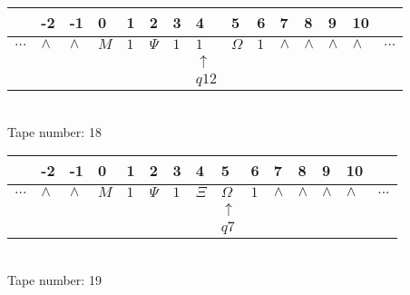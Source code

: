 \documentclass{article}
\begin{document}
\begin{table}[H]
\centering
\begin{tabular}{lllllllllllllll}
 & -2 & -1 & 0 & 1 & 2 & 3 & 4 & 5 & 6 & 7 & 8 & 9 & 10 & \\
\hline
$...$ & \multicolumn{1}{|l|}{$\wedge$} & \multicolumn{1}{|l|}{$\wedge$} & \multicolumn{1}{|l|}{$M$} & \multicolumn{1}{|l|}{$1$} & \multicolumn{1}{|l|}{$\Psi$} & \multicolumn{1}{|l|}{$1$} & \multicolumn{1}{|l|}{$1$} & \multicolumn{1}{|l|}{$\Omega$} & \multicolumn{1}{|l|}{$1$} & \multicolumn{1}{|l|}{$\wedge$} & \multicolumn{1}{|l|}{$\wedge$} & \multicolumn{1}{|l|}{$\wedge$} & \multicolumn{1}{|l|}{$\wedge$} & $...$\\
\hline
&  &  &  &  &  &  & $\uparrow$ &  &  &  &  &  &  &  \\
&  &  &  &  &  &  & $ q12 $ &  &  &  &  &  &  &  \\
\end{tabular}
\\
Tape number: 18
\noindent\makebox[\linewidth]{\hdashrule{\textwidth}{1pt}{1pt}}\end{table}

\begin{table}[H]
\centering
\begin{tabular}{lllllllllllllll}
 & -2 & -1 & 0 & 1 & 2 & 3 & 4 & 5 & 6 & 7 & 8 & 9 & 10 & \\
\hline
$...$ & \multicolumn{1}{|l|}{$\wedge$} & \multicolumn{1}{|l|}{$\wedge$} & \multicolumn{1}{|l|}{$M$} & \multicolumn{1}{|l|}{$1$} & \multicolumn{1}{|l|}{$\Psi$} & \multicolumn{1}{|l|}{$1$} & \multicolumn{1}{|l|}{$\Xi$} & \multicolumn{1}{|l|}{$\Omega$} & \multicolumn{1}{|l|}{$1$} & \multicolumn{1}{|l|}{$\wedge$} & \multicolumn{1}{|l|}{$\wedge$} & \multicolumn{1}{|l|}{$\wedge$} & \multicolumn{1}{|l|}{$\wedge$} & $...$\\
\hline
&  &  &  &  &  &  &  & $\uparrow$ &  &  &  &  &  &  \\
&  &  &  &  &  &  &  & $ q7 $ &  &  &  &  &  &  \\
\end{tabular}
\\
Tape number: 19
\noindent\makebox[\linewidth]{\hdashrule{\textwidth}{1pt}{1pt}}\end{table}
\end{document}
